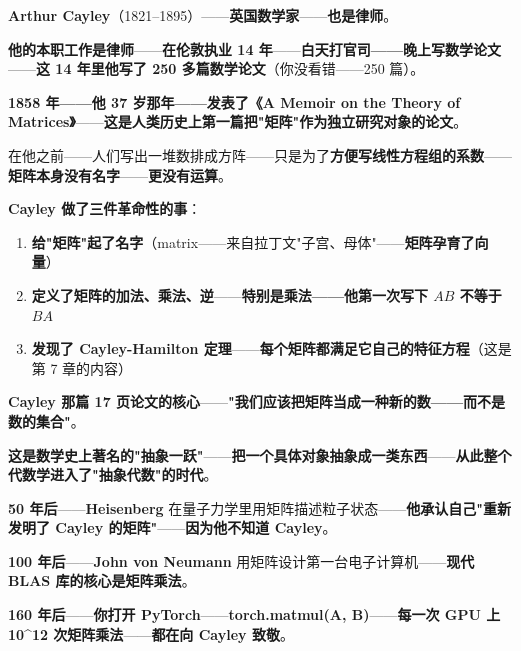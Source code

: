 \begin{tcolorbox}[storybox={\Large 小故事：Cayley 与"矩阵的抽象"（1858）}]
\textbf{Arthur Cayley}（1821--1895）——\textbf{英国数学家}——\textbf{也是律师}。

\medskip

\textbf{他的本职工作是律师}——\textbf{在伦敦执业 14 年}——\textbf{白天打官司——晚上写数学论文}——\textbf{这 14 年里他写了 250 多篇数学论文}（你没看错——250 篇）。

\medskip

\textbf{1858 年——他 37 岁那年——发表了《A Memoir on the Theory of Matrices》}——\textbf{这是人类历史上第一篇把"矩阵"作为独立研究对象的论文}。

\medskip

在他之前——人们写出一堆数排成方阵——只是为了\textbf{方便写线性方程组的系数}——\textbf{矩阵本身没有名字}——\textbf{更没有运算}。

\medskip

\textbf{Cayley 做了三件革命性的事}：

\begin{enumerate}
\item \textbf{给"矩阵"起了名字}（matrix——来自拉丁文"子宫、母体"——\textbf{矩阵孕育了向量}）
\item \textbf{定义了矩阵的加法、乘法、逆}——\textbf{特别是乘法——他第一次写下 $AB$ 不等于 $BA$}
\item \textbf{发现了 Cayley-Hamilton 定理}——\textbf{每个矩阵都满足它自己的特征方程}（这是第 7 章的内容）
\end{enumerate}

\medskip

\textbf{Cayley 那篇 17 页论文的核心}——\textbf{"我们应该把矩阵当成一种新的数——而不是数的集合"}。

\medskip

\textbf{这是数学史上著名的"抽象一跃"}——\textbf{把一个具体对象抽象成一类东西}——\textbf{从此整个代数学进入了"抽象代数"的时代}。

\medskip

\textbf{50 年后}——\textbf{Heisenberg} 在量子力学里用矩阵描述粒子状态——\textbf{他承认自己"重新发明了 Cayley 的矩阵"}——\textbf{因为他不知道 Cayley}。

\medskip

\textbf{100 年后}——\textbf{John von Neumann} 用矩阵设计第一台电子计算机——\textbf{现代 BLAS 库的核心是矩阵乘法}。

\medskip

\textbf{160 年后}——\textbf{你打开 PyTorch}——\textbf{torch.matmul(A, B)}——\textbf{每一次 GPU 上 10\^{}{12} 次矩阵乘法}——\textbf{都在向 Cayley 致敬}。
\end{tcolorbox}

